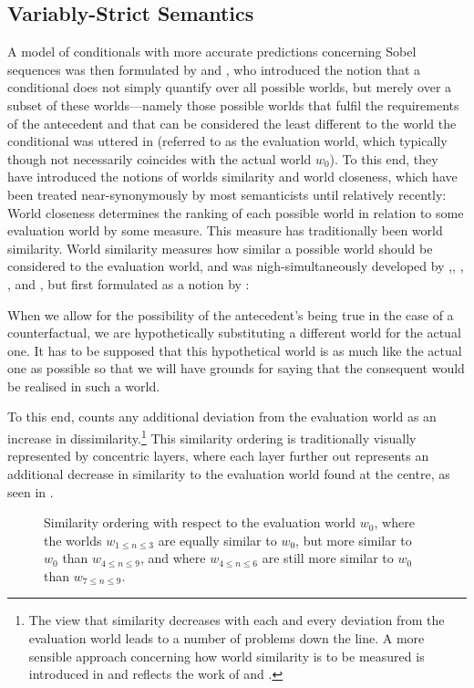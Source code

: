 \subsection{Variably-Strict Semantics}
A model of conditionals with more accurate predictions concerning Sobel sequences was then formulated by \textcite{Stalnaker1968} and \textcite{Lewis1973}, who introduced the notion that a conditional does not simply quantify over all possible worlds, but merely over a subset of these worlds---namely those possible worlds that fulfil the requirements of the antecedent and that can be considered the least different to the world the conditional was uttered in (referred to as the evaluation world, which typically though not necessarily coincides with the actual world $w_0$). To this end, they have introduced the notions of worlds similarity and world closeness, which have been treated near-synonymously by most semanticists until relatively recently: World closeness determines the ranking of each possible world in relation to some evaluation world by some measure. This measure has traditionally been world similarity. World similarity measures how similar a possible world should be considered to the evaluation world, and was nigh-simultaneously developed by \textcite{Stalnaker1968},\linebreak \textcite{Stalnaker1970}, \textcite{Sprigge1970}, \textcite{Lewis1973}, and \textcite{Nute1975}, but first formulated as a notion by \textcite[p. 107]{Todd1964}:
\begin{displayquote}
When we allow for the possibility of the antecedent’s being true in the case of a counterfactual, we are hypothetically substituting a different world for the actual one. It has to be supposed that this hypothetical world is as much like the actual one as possible so that we will have grounds for saying that the consequent would be realised in such a world.
\end{displayquote}
To this end, \textcite{Lewis1973} counts any additional deviation from the evaluation world as an increase in dissimilarity.\footnote{The view that similarity decreases with each and every deviation from the evaluation world leads to a number of problems down the line. A more sensible approach concerning how world similarity is to be measured is introduced in  and reflects the work of \textcite{Bennett2003} and \textcite{Arregui2009}.} This similarity ordering is traditionally visually represented by concentric layers, where each layer further out represents an additional decrease in similarity to the evaluation world found at the centre, as seen in .
\begin{figure}[!htb]

\caption{Similarity ordering with respect to the evaluation world $w_0$, where the worlds $w_{1\leqslant n\leqslant3}$ are equally similar to $w_0$, but more similar to $w_0$ than $w_{4\leqslant n\leqslant9}$, and where $w_{4\leqslant n\leqslant6}$ are still more similar to $w_0$ than $w_{7\leqslant n\leqslant9}$.}
\end{figure}

